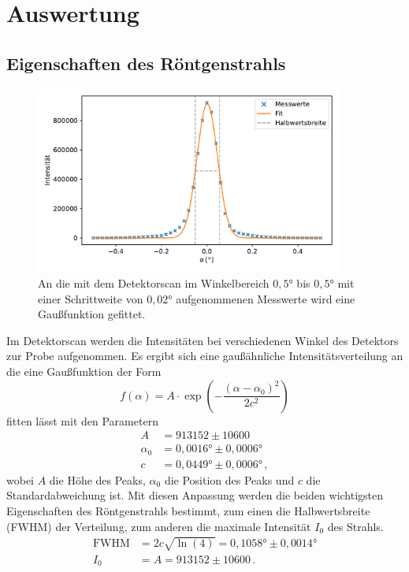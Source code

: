 \newpage
\section{Auswertung}
\label{sec:auswertung}
\subsection{Eigenschaften des Röntgenstrahls}
    \begin{figure}[ht]
        \centering
        \includegraphics[width = 0.9\textwidth]{plots/DetektorScan.pdf}
        \caption{An die mit dem Detektorscan im Winkelbereich $0,5°$ bis $0,5°$ mit einer Schrittweite von $0,02°$ aufgenommenen Messwerte wird eine Gaußfunktion gefittet.}
        \label{fig:DetektorScan}
    \end{figure}

    Im Detektorscan werden die Intensitäten bei verschiedenen Winkel des Detektors zur Probe aufgenommen.
    Es ergibt sich eine gaußähnliche Intensitätsverteilung an die eine Gaußfunktion der Form
    \begin{equation*}
        f(\alpha) = A \cdot \exp\left(- \frac{(\alpha - \alpha_0)^2}{2 c^2}\right)
    \end{equation*}
    fitten lässt mit den Parametern
    \begin{align*}
        A &= 913152 \pm 10600 \\
        \alpha_0 &= 0,0016° \pm 0,0006° \\
        c &= 0,0449° \pm 0,0006° \,,
    \end{align*}
    wobei $A$ die Höhe des Peaks, $\alpha_0$ die Position des Peaks und $c$ die Standardabweichung ist.
    Mit diesen Anpassung werden die beiden wichtigsten Eigenschaften des Röntgenstrahls bestimmt, zum einen die Halbwertsbreite (FWHM) der Verteilung, zum anderen die maximale Intensität $I_0$ des Strahls.
    \begin{align*}
        \mathrm{FWHM} &= 2 c \sqrt{\ln(4)} = 0,1058° \pm 0,0014° \\
        I_0 &= A = 913152 \pm 10600 \,.
    \end{align*}

